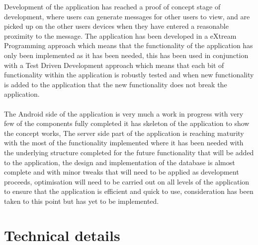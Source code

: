 \documentclass[a0,landscape]{a0poster}
\begin{document}
\begin{multicols}{4}
Development of the application has reached a proof of concept stage of development, where users can generate messages for other users to view, and are picked up on the other users devices when they have entered a reasonable proximity to the message. The application has been developed in a eXtream Programming approach which means that the functionality of the application has only been implemented as it has been needed, this has been used in conjunction with a Test Driven Development approach which means that each bit of functionality within the application is robustly tested and when new functionality is added to the application that the new functionality does not break the application.\\
\\
The Android side of the application is very much a work in progress with very few of the components fully completed it has skeleton of the application to show the concept works, The server side part of the application is reaching maturity with the most of the functionality implemented where it has been needed with the underlying structure completed for the future functionality that will be added to the application, the design and implementation of the database is almost complete and with minor tweaks that will need to be applied as development proceeds, optimisation will need to be carried out on all levels of the application to ensure that the application is efficient and quick to use, consideration has been taken to this point but has yet to be implemented.

\section{Technical details}


\end{multicols}
\end{document}
